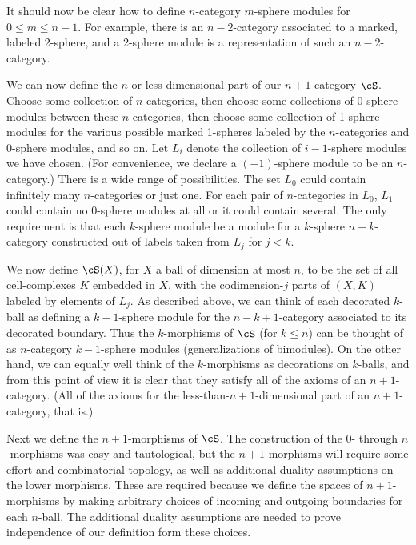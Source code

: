 \medskip

It should now be clear how to define $n$-category $m$-sphere modules for $0\le m \le n-1$.
For example, there is an $n{-}2$-category associated to a marked, labeled 2-sphere,
and a 2-sphere module is a representation of such an $n{-}2$-category.

\medskip

We can now define the $n$-or-less-dimensional part of our $n{+}1$-category $\cS$.
Choose some collection of $n$-categories, then choose some collections of 0-sphere modules between
these $n$-categories, then choose some collection of 1-sphere modules for the various
possible marked 1-spheres labeled by the $n$-categories and 0-sphere modules, and so on.
Let $L_i$ denote the collection of $i{-}1$-sphere modules we have chosen.
(For convenience, we declare a $(-1)$-sphere module to be an $n$-category.)
There is a wide range of possibilities.
The set $L_0$ could contain infinitely many $n$-categories or just one.
For each pair of $n$-categories in $L_0$, $L_1$ could contain no 0-sphere modules at all or 
it could contain several.
The only requirement is that each $k$-sphere module be a module for a $k$-sphere $n{-}k$-category
constructed out of labels taken from $L_j$ for $j<k$.

We now define $\cS(X)$, for $X$ a ball of dimension at most $n$, to be the set of all 
cell-complexes $K$ embedded in $X$, with the codimension-$j$ parts of $(X, K)$ labeled
by elements of $L_j$.
As described above, we can think of each decorated $k$-ball as defining a $k{-}1$-sphere module
for the $n{-}k{+}1$-category associated to its decorated boundary.
Thus the $k$-morphisms of $\cS$ (for $k\le n$) can be thought 
of as $n$-category $k{-}1$-sphere modules 
(generalizations of bimodules).
On the other hand, we can equally well think of the $k$-morphisms as decorations on $k$-balls, 
and from this point of view it is clear that they satisfy all of the axioms of an
$n{+}1$-category.
(All of the axioms for the less-than-$n{+}1$-dimensional part of an $n{+}1$-category, that is.)

\medskip

Next we define the $n{+}1$-morphisms of $\cS$.
The construction of the 0- through $n$-morphisms was easy and tautological, but the 
$n{+}1$-morphisms will require some effort and combinatorial topology, as well as additional
duality assumptions on the lower morphisms. These are required because we define the spaces of $n{+}1$-morphisms by making arbitrary choices of incoming and outgoing boundaries for each $n$-ball. The additional duality assumptions are needed to prove independence of our definition form these choices.

